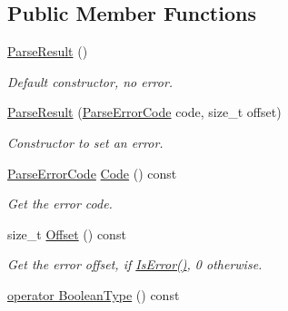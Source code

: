 \subsection*{Public Member Functions}
\begin{DoxyCompactItemize}
\item 
\hyperlink{structParseResult_acd4a266f815bec59fa27f64f1923fe9e}{Parse\+Result} ()\hypertarget{structParseResult_acd4a266f815bec59fa27f64f1923fe9e}{}\label{structParseResult_acd4a266f815bec59fa27f64f1923fe9e}

\begin{DoxyCompactList}\small\item\em Default constructor, no error. \end{DoxyCompactList}\item 
\hyperlink{structParseResult_a38ca49a53e80633d0864ad5026adaf84}{Parse\+Result} (\hyperlink{group__RAPIDJSON__ERRORS_ga8d4b32dfc45840bca189ade2bbcb6ba7}{Parse\+Error\+Code} code, size\+\_\+t offset)\hypertarget{structParseResult_a38ca49a53e80633d0864ad5026adaf84}{}\label{structParseResult_a38ca49a53e80633d0864ad5026adaf84}

\begin{DoxyCompactList}\small\item\em Constructor to set an error. \end{DoxyCompactList}\item 
\hyperlink{group__RAPIDJSON__ERRORS_ga8d4b32dfc45840bca189ade2bbcb6ba7}{Parse\+Error\+Code} \hyperlink{structParseResult_a1062b22f0d006e2f8a5b8c74385ff52d}{Code} () const \hypertarget{structParseResult_a1062b22f0d006e2f8a5b8c74385ff52d}{}\label{structParseResult_a1062b22f0d006e2f8a5b8c74385ff52d}

\begin{DoxyCompactList}\small\item\em Get the error code. \end{DoxyCompactList}\item 
size\+\_\+t \hyperlink{structParseResult_aa65430daa3920be0d42dc4baed86df69}{Offset} () const \hypertarget{structParseResult_aa65430daa3920be0d42dc4baed86df69}{}\label{structParseResult_aa65430daa3920be0d42dc4baed86df69}

\begin{DoxyCompactList}\small\item\em Get the error offset, if \hyperlink{structParseResult_a07c35a6769f5cb8a73cbc56c41e60a2a}{Is\+Error()}, 0 otherwise. \end{DoxyCompactList}\item 
\hyperlink{structParseResult_acb8bfbedac9d41f09b64243bd505bc5c}{operator Boolean\+Type} () const \hypertarget{structParseResult_acb8bfbedac9d41f09b64243bd505bc5c}{}\label{structParseResult_acb8bfbedac9d41f09b64243bd505bc5c}


\end{DoxyCompactItemize}
